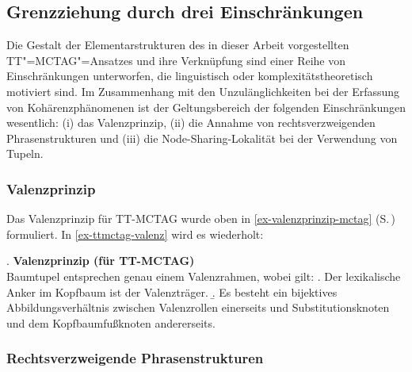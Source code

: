 \subsection{Grenzziehung durch drei Einschränkungen}

Die Gestalt der Elementarstrukturen des in dieser Arbeit vorgestellten TT"=MCTAG"=Ansatzes und ihre Verknüpfung sind einer Reihe von Einschränkungen unterworfen, die linguistisch oder komplexitätstheoretisch motiviert sind. Im Zusammenhang mit den Unzulänglichkeiten bei der Erfassung von Kohärenzphänomenen ist der Geltungsbereich der folgenden Einschränkungen wesentlich: (i) das Valenzprinzip, (ii) die Annahme von rechtsverzweigenden Phrasenstrukturen und (iii) die Node-Sharing-Lokalität bei der Verwendung von Tupeln. 

\subsubsection*{Valenzprinzip}

Das Valenzprinzip für TT-MCTAG wurde oben in \ref{ex-valenzprinzip-mctag} (S.\,\pageref{ex-valenzprinzip-mctag}) formuliert. In \ref{ex-ttmctag-valenz} wird es wiederholt:

\ex. \label{ex-ttmctag-valenz}{\bf Valenzprinzip (für TT-MCTAG)} \\ 
Baumtupel entsprechen genau einem Valenzrahmen, wobei gilt:
\a. Der lexikalische Anker im Kopfbaum ist der Valenzträger.
\b. Es besteht ein bijektives Abbildungsverhältnis zwischen Valenzrollen einerseits und Substitutionsknoten und dem Kopfbaumfu\ss knoten andererseits.

\subsubsection*{Rechtsverzweigende Phrasenstrukturen}

